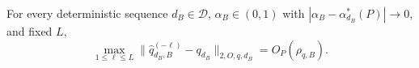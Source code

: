 For every deterministic sequence \(d_B\in\mathcal D\), \(\alpha_B\in(0,1)\) with \(|\alpha_B-\alpha_{d_B}^*(P)|\to0\), and fixed \(L\),
\[
\max_{1\le\ell\le L}\|\widehat q_{d_B,B}^{(-\ell)}-q_{d_B}\|_{2,O,q,d_B}=O_P(\rho_{q,B}).
\]
